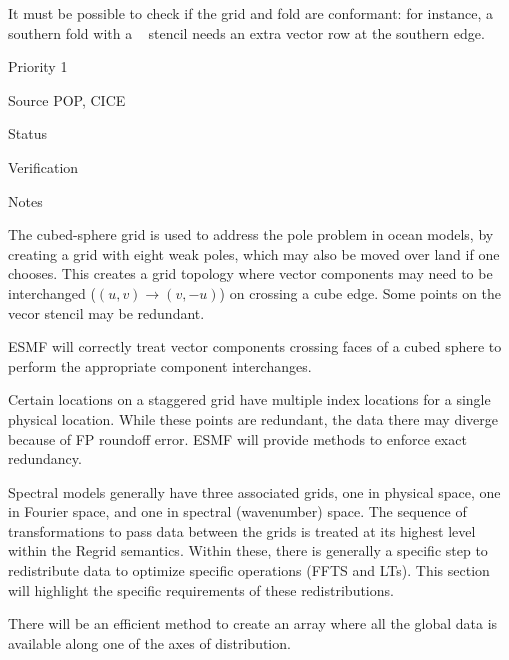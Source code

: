 
It must be possible to check if the grid and fold are conformant:
for instance, a southern fold with a \bgrid~ stencil needs an extra
vector row at the southern edge.

\begin{reqlist}
\item[Priority] 1
\item[Source] POP, CICE
\item[Status]
\item[Verification]
\item[Notes]
\end{reqlist}


The cubed-sphere grid \cite{ref:rpm1996} is used to address the pole
problem in ocean models, by creating a grid with eight weak poles,
which may also be moved over land if one chooses. This creates a grid
topology where vector components may need to be interchanged
($(u,v)\longrightarrow(v,-u)$) on crossing a cube edge. Some points on
the vecor stencil may be redundant.


ESMF will correctly treat vector components crossing faces of a cubed
sphere to perform the appropriate component interchanges.


Certain locations on a staggered grid have multiple index locations
for a single physical location. While these points are redundant, the
data there may diverge because of FP roundoff error. ESMF will provide
methods to enforce exact redundancy.


Spectral models generally have three associated grids, one in physical
space, one in Fourier space, and one in spectral (wavenumber) space. The sequence of
transformations to pass data between the grids is treated at its
highest level within the Regrid semantics. Within these, there is
generally a specific step to redistribute data to optimize specific
operations (FFTS and LTs). This section will highlight the specific
requirements of these redistributions.


There will be an efficient method to create an array where all the
global data is available along one of the axes of distribution.

